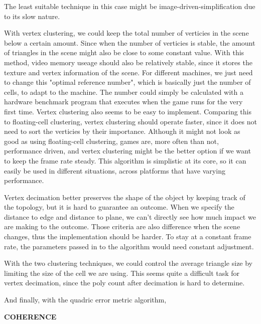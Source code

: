 \documentclass[12pt]{article}
\begin{document}
The least suitable technique in this case might be image-driven-simplification due to its slow nature. \par
With vertex clustering, we could keep the total number of verticies in the scene below a certain amount. Since when the number
of verticies is stable, the amount of triangles in the scene might also be close to some constant value. With this method, video 
memory useage should also be relatively stable, since it stores the texture and vertex information of the scene. For different 
machines, we just need to change this "optimal reference number", which is basically just the number of cells, 
to adapt to the machine. The number could simply be calculated with a hardware benchmark program that executes when the game 
runs for the very first time. Vertex clustering also seems to be easy to implement. Comparing this to floating-cell clustering,
vertex clustering should operate faster, since it does not need to sort the verticies by their importance. Although it might not look
as good as using floating-cell clustering, games are, more often than not, performance driven, and vertex clustering might be the 
better option if we want to keep the frame rate steady. This algorithm is simplistic at its core, so it can easily be used in
different situations, across platforms that have varying performance.\par

Vertex decimation better preserves the shape of the object by keeping track of the topology, but it is hard to guarantee an outcome.
When we specify the distance to edge and distance to plane, we can't directly see how much impact we are making to the outcome. Those
criteria are also difference when the scene changes, thus the implementation should be harder. To stay at a constant frame rate, 
the parameters passed in to the algorithm would need constant adjustment. \par

With the two clustering techniques, we could control the average triangle size by limiting the size of the cell we are using. This 
seems quite a difficult task for vertex decimation, since the poly count after decimation is hard to determine. \par

And finally, with the quadric error metric algorithm, 

\begin{center}
	{\bf COHERENCE}
\end{center}
\end{document}
